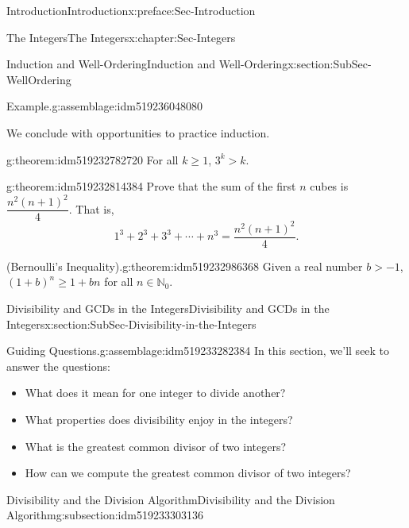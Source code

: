\documentclass[oneside,10pt,]{book}
\numberwithin{equation}{section}
\renewcommand{\ge}{\geqslant}
\def\N{{\mathbb N}}
\begin{document}
\begin{preface}{Introduction}{}{Introduction}{}{}{x:preface:Sec-Introduction}
\begin{chapterptx}{The Integers}{}{The Integers}{}{}{x:chapter:Sec-Integers}
\begin{sectionptx}{Induction and Well-Ordering}{}{Induction and Well-Ordering}{}{}{x:section:SubSec-WellOrdering}
\begin{assemblage}{Example.}{g:assemblage:idm519236048080}
\end{assemblage}
We conclude with opportunities to practice induction.%
\begin{theorem}{}{}{g:theorem:idm519232782720}%
For all \(k\ge 1\), \(3^k > k\).%
\end{theorem}
\begin{theorem}{}{}{g:theorem:idm519232814384}%
Prove that the sum of the first \(n\) cubes is \(\dfrac{n^2(n+1)^2}{4}\). That is,%
%
\begin{equation*}
1^3 + 2^3 + 3^3 + \cdots + n^3 = \dfrac{n^2(n+1)^2}{4}.
\end{equation*}
\end{theorem}
\begin{theorem}{(Bernoulli's Inequality).}{}{g:theorem:idm519232986368}%
Given a real number \(b > -1\), \((1+b)^n \ge 1 + bn\) for all \(n\in \N_0\).\end{theorem}
\end{sectionptx}
%
%
\typeout{************************************************}
\typeout{************************************************}
%
\begin{sectionptx}{Divisibility and GCDs in the Integers}{}{Divisibility and GCDs in the Integers}{}{}{x:section:SubSec-Divisibility-in-the-Integers}
\begin{assemblage}{Guiding Questions.}{g:assemblage:idm519233282384}%
In this section, we'll seek to answer the questions: %
\begin{itemize}[label=\textbullet]
\item{}What does it mean for one integer to divide another?%
\item{}What properties does divisibility enjoy in the integers?%
\item{}What is the greatest common divisor of two integers?%
\item{}How can we compute the greatest common divisor of two integers?%
\end{itemize}
%
\end{assemblage}
%
%
\typeout{************************************************}
\typeout{************************************************}
%
\begin{subsectionptx}{Divisibility and the Division Algorithm}{}{Divisibility and the Division Algorithm}{}{}{g:subsection:idm519233303136}

\end{subsectionptx}
\end{sectionptx}
\end{chapterptx}
\end{preface}
\end{document}
